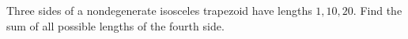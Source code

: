 Three sides of a nondegenerate isosceles trapezoid have lengths $1,10,20$. Find the sum of all possible lengths of the fourth side.
